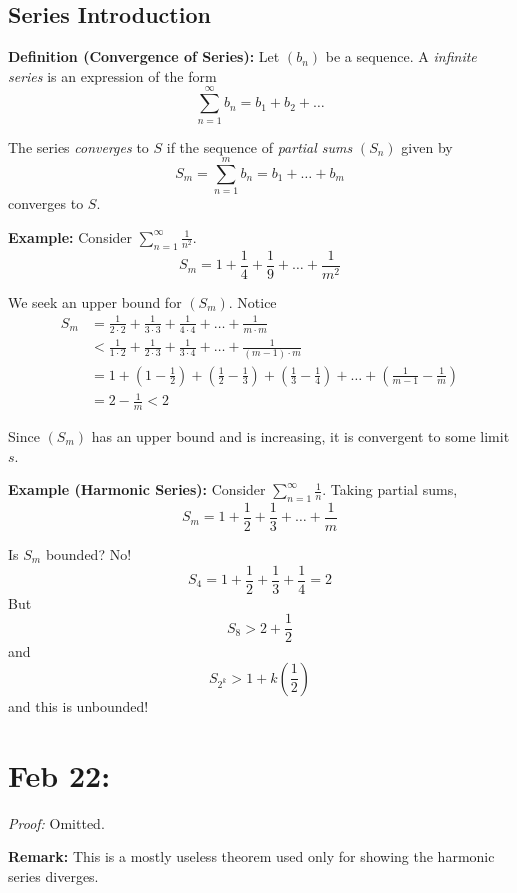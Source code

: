 \documentclass[12pt]{report}
\newcommand{\N}{\mathbb{N}}
\newenvironment*{tbox}[2][gray]{
    \begin{tcolorbox}[
        parbox=false,
        colback=#1!5!white,
        colframe=#1!75!black,
        breakable,
        title={#2}
    ]}
    {\end{tcolorbox}}
\begin{document}
    \subsection*{Series Introduction} 
        \textbf{Definition (Convergence of Series):} Let $(b_n)$ be a sequence. A \emph{infinite series} is an expression of the form 
        \[\sum_{n=1}^{\infty} b_n = b_1 + b_2 + \dots\]

        The series \emph{converges} to $S$ if the sequence of \emph{partial sums} $(S_n)$ given by 
        \[S_m = \sum_{n=1}^m b_n = b_1 + \dots + b_m\]
        converges to $S$.

        \textbf{Example:} Consider $\sum_{n=1}^{\infty} \frac{1}{n^2}$. 
        \[S_m = 1 + \frac{1}{4} + \frac{1}{9} + \dots + \frac{1}{m^2}\]
        
        We seek an upper bound for $(S_m)$. Notice 
        \begin{align*}
            S_m &= \frac{1}{2 \cdot 2} + \frac{1}{3 \cdot 3} + \frac{1}{4 \cdot 4} + \dots + \frac{1}{m \cdot m}\\ 
                &< \frac{1}{1 \cdot 2} + \frac{1}{2 \cdot 3} + \frac{1}{3 \cdot 4} + \dots + \frac{1}{(m-1) \cdot m}\\ 
                &= 1 + (1 - \frac{1}{2}) + (\frac{1}{2} - \frac{1}{3}) + (\frac{1}{3} - \frac{1}{4}) + \dots + (\frac{1}{m-1} - \frac{1}{m})\\
                &= 2 - \frac{1}{m} < 2
        \end{align*}

        Since $(S_m)$ has an upper bound and is increasing, it is convergent to some limit $s$. 

        \textbf{Example (Harmonic Series):} Consider $\sum_{n=1}^{\infty} \frac{1}{n}$. Taking partial sums, 
        \[S_m = 1 + \frac{1}{2} + \frac{1}{3} + \dots + \frac{1}{m}\] 

        Is $S_m$ bounded? No! 
        \[S_4 = 1 + \frac{1}{2} + \frac{1}{3} + \frac{1}{4} = 2\] 
        But 
        \[S_8 > 2 + \frac{1}{2}\]
        and 
        \[S_{2^k} > 1 + k(\frac{1}{2})\]
        and this is unbounded! 

\section{Feb 22:}
    \begin{tbox}{\textbf{Theorem (Cauchy Condensation Test):} Suppose $(b_n)$ is decreasing and $b_n \geq 0 \quad \forall n \in \N$. Then $\sum_{n=1}^{\infty} b_n$ converges iff $\sum_{n=1}^{\infty} 2^n b_{2^n} = b_1 + 2b_2 + 4b_4 + 8b_8 + \dots$ converges }
        \emph{Proof:} Omitted. 

        \textbf{Remark:} This is a mostly useless theorem used only for showing the harmonic series diverges. 
    \end{tbox}
\end{document}
